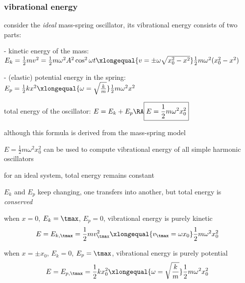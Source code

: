 

\subsubsection{vibrational energy}

consider the \emph{ideal} mass-spring oscillator, its vibrational energy consists of two parts:

\begin{compactitem}
	\item[-] kinetic energy of the mass: $E_k = \frac{1}{2} mv^2 = \frac{1}{2} m \omega^2 A^2 \cos^2\omega t \xlongequal{v=\pm\omega\sqrt{x_0^2-x^2}} \frac{1}{2}m\omega^2 (x_0^2-x^2)$
	
	\item[-] (elastic) potential energy in the spring: $E_p = \frac{1}{2} kx^2  \xlongequal{\omega = \sqrt{\frac{k}{m}}} \frac{1}{2}m\omega^2 x^2$
\end{compactitem}

total energy of the oscillator: $E = E_k + E_p \RA \boxed{E = \frac{1}{2}m\omega^2x_0^2}$

\cmt although this formula is derived from the mass-spring model

$E = \frac{1}{2}m\omega^2x_0^2$ can be used to compute vibrational energy of all simple harmonic oscillators

\cmt for an ideal system, total energy remains constant

$E_k$ and $E_p$ keep changing, one transfers into another, but total energy is \emph{conserved}

\cmt when $x=0$, $E_k = \tmax$, $E_p=0$, vibrational energy is purely kinetic
\begin{equation*}
	E=E_{k,\tmax}=\frac{1}{2}mv_\tmax^2 \xlongequal{v_\tmax = \omega x_0} \frac{1}{2}m\omega^2x_0^2
\end{equation*}

\cmt when $x=\pm x_0$, $E_k = 0$, $E_p=\tmax$, vibrational energy is purely potential
\begin{equation*}
	E=E_{p,\tmax}=\frac{1}{2}kx_0^2 \xlongequal{\omega=\sqrt{\frac{k}{m}}} \frac{1}{2}m\omega^2x_0^2
\end{equation*}

